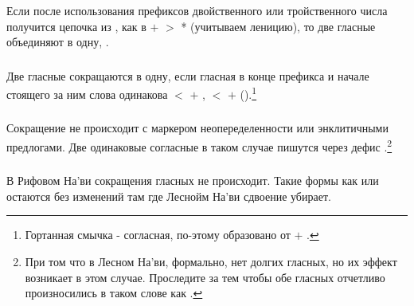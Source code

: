 \subsubsection{} Если после использования префиксов двойственного или тройственного числа получится цепочка из , как в  $+$  $>$ * (учитываем леницию), то две гласные объединяют в одну, .
\label{l-and-s:phonotactics:nsc} 

\subsubsection{} Две гласные сокращаются в одну, если гласная в конце префикса и начале стоящего за ним слова одинакова  $<$
 $+$ ,  $<$  $+$ 
().\footnote{Гортанная смычка - согласная, по-этому  образовано от  $+$ .}
\label{l-and-s:phonotactics:precontract}

\subsubsection{} Сокращение не происходит с маркером неопеределенности  или энклитичными предлогами. Две одинаковые согласные в таком случае пишутся через дефис 
  .\footnote{При том что в Лесном На'ви, формально, нет долгих гласных, но их эффект возникает в этом случае. Проследите за тем чтобы обе гласных  отчетливо произносились в таком слове как .}

\subsubsection{} В Рифовом На'ви сокращения гласных не происходит.
Такие формы как  или  остаются без изменений там где Леснойм На'ви сдвоение убирает.
\label{rn:no-contract}

